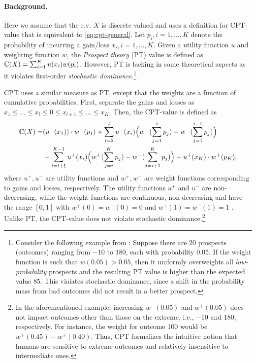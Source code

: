 \paragraph{Background.}
Here we assume that the r.v. $X$ is discrete valued and uses a definition for CPT-value that is equivalent to \eqref{eq:cpt-general}.
Let $p_i, i=1,\ldots,K$ denote the probability of incurring a gain/loss $x_i, i=1,\ldots,K$. %
Given a utility function $u$ and weighting function $w$, the \textit{Prospect theory} (PT) value is defined as $\mathbb{C}(X) = \sum_{i=1}^K u(x_i) w(p_i)$. 
However, PT is lacking in some theoretical aspects as it violates first-order \textit{stochastic dominance}.\footnote{Consider the following example from \cite{fennema1997original}: Suppose there are $20$ prospects (outcomes) ranging from $-10$ to $180$, each with probability $0.05$. If the weight function is such that $w(0.05) > 0.05$, then it uniformly overweights all \textit{low-probability} prospects and the resulting PT value is higher than the expected value $85$. This violates stochastic dominance, since a shift in the probability mass from bad outcomes did not result in a better prospect.}

CPT uses a similar measure as PT, except that the weights are a function of cumulative probabilities. First, separate the gains and losses as 
$x_1\le \ldots \le x_l \le 0 \le x_{l+1} \le \ldots \le x_K$. Then, the CPT-value is defined as 
\begin{align}
\label{eq:cpt-discrete}
\mathbb{C}(X) = &(u^-(x_1))\cdot w^-(p_1) 
+\sum_{i=2}^l u^-(x_i) \Big(w^-(\sum_{j=1}^i p_j) - w^-(\sum_{j=1}^{i-1} p_j)\Big) 
\\&
 + \sum_{i=l+1}^{K-1} u^+(x_i) \Big(w^+(\sum_{j=i}^K p_j) - w^-(\sum_{j=i+1}^K p_j) \Big)
 + u^+(x_K)\cdot w^+(p_K), 
\end{align} 
where $u^+, u^-$ are utility functions and $w^+, w^-$ are weight functions corresponding to gains and losses, respectively. The utility functions $u^+$ and $u^-$ are non-decreasing, while the weight functions are continuous, non-decreasing and have the range $[0,1]$ with $w^+(0)=w^-(0)=0$ and $w^+(1)=w^-(1)=1$ . 
Unlike PT, the CPT-value does not violate stochastic dominance.\footnote{In the aforementioned example, increasing $w^-(0.05)$ and $w^+(0.05)$ does not impact outcomes other than those on the extreme, i.e., $-10$ and $180$, respectively. For instance, the weight for outcome $100$ would be $w^+(0.45) - w^+(0.40)$. Thus, CPT formalizes the intuitive notion that humans are sensitive to extreme outcomes and relatively insensitive to intermediate ones.}

